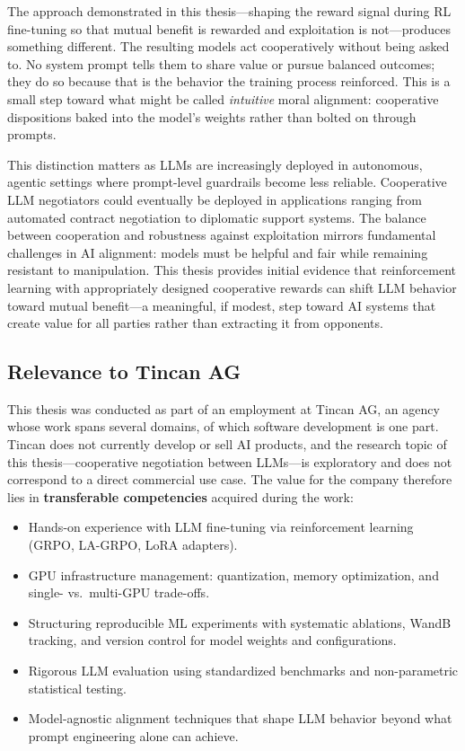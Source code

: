 \documentclass[12pt,a4paper]{article}
\begin{document}
The approach demonstrated in this thesis---shaping the reward signal during RL fine-tuning so that mutual benefit is rewarded and exploitation is not---produces something different. The resulting models act cooperatively without being asked to. No system prompt tells them to share value or pursue balanced outcomes; they do so because that is the behavior the training process reinforced. This is a small step toward what might be called \emph{intuitive} moral alignment: cooperative dispositions baked into the model's weights rather than bolted on through prompts.

This distinction matters as LLMs are increasingly deployed in autonomous, agentic settings where prompt-level guardrails become less reliable. Cooperative LLM negotiators could eventually be deployed in applications ranging from automated contract negotiation to diplomatic support systems. The balance between cooperation and robustness against exploitation mirrors fundamental challenges in AI alignment: models must be helpful and fair while remaining resistant to manipulation. This thesis provides initial evidence that reinforcement learning with appropriately designed cooperative rewards can shift LLM behavior toward mutual benefit---a meaningful, if modest, step toward AI systems that create value for all parties rather than extracting it from opponents.

\subsection{Relevance to Tincan AG}

This thesis was conducted as part of an employment at Tincan AG, an agency whose work spans several domains, of which software development is one part. Tincan does not currently develop or sell AI products, and the research topic of this thesis---cooperative negotiation between LLMs---is exploratory and does not correspond to a direct commercial use case. The value for the company therefore lies in \textbf{transferable competencies} acquired during the work:

\begin{itemize}
    \item Hands-on experience with LLM fine-tuning via reinforcement learning (GRPO, LA-GRPO, LoRA adapters).
    \item GPU infrastructure management: quantization, memory optimization, and single- vs.\ multi-GPU trade-offs.
    \item Structuring reproducible ML experiments with systematic ablations, WandB tracking, and version control for model weights and configurations.
    \item Rigorous LLM evaluation using standardized benchmarks and non-parametric statistical testing.
    \item Model-agnostic alignment techniques that shape LLM behavior beyond what prompt engineering alone can achieve.
\end{itemize}
\end{document}
